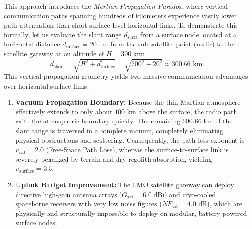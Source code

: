 \documentclass{ijuc}
\begin{document}
This approach introduces the \textit{Martian Propagation Paradox}, where vertical communication paths spanning hundreds of kilometers experience vastly lower path attenuation than short surface-level horizontal links. To demonstrate this formally, let us evaluate the slant range $d_{\text{slant}}$ from a surface node located at a horizontal distance $d_{\text{surface}} = 20\text{ km}$ from the sub-satellite point (nadir) to the satellite gateway at an altitude of $H = 300\text{ km}$:
\begin{equation}
    d_{\text{slant}} = \sqrt{H^2 + d_{\text{surface}}^2} = \sqrt{300^2 + 20^2} \approx 300.66\text{ km}
\end{equation}
This vertical propagation geometry yields two massive communication advantages over horizontal surface links:
\begin{enumerate}
    \item \textbf{Vacuum Propagation Boundary:} Because the thin Martian atmosphere effectively extends to only about $100\text{ km}$ above the surface, the radio path exits the atmospheric boundary quickly. The remaining $200.66\text{ km}$ of the slant range is traversed in a complete vacuum, completely eliminating physical obstructions and scattering. Consequently, the path loss exponent is $n_{\text{sat}} = 2.0$ (Free-Space Path Loss), whereas the surface-to-surface link is severely penalized by terrain and dry regolith absorption, yielding $n_{\text{surface}} = 3.5$.
    \item \textbf{Uplink Budget Improvement:} The LMO satellite gateway can deploy directive high-gain antenna arrays ($G_{\text{sat}} = 6.0\text{ dBi}$) and cryo-cooled spaceborne receivers with very low noise figures ($NF_{\text{sat}} = 4.0\text{ dB}$), which are physically and structurally impossible to deploy on modular, battery-powered surface nodes.
\end{enumerate}
\end{document}
